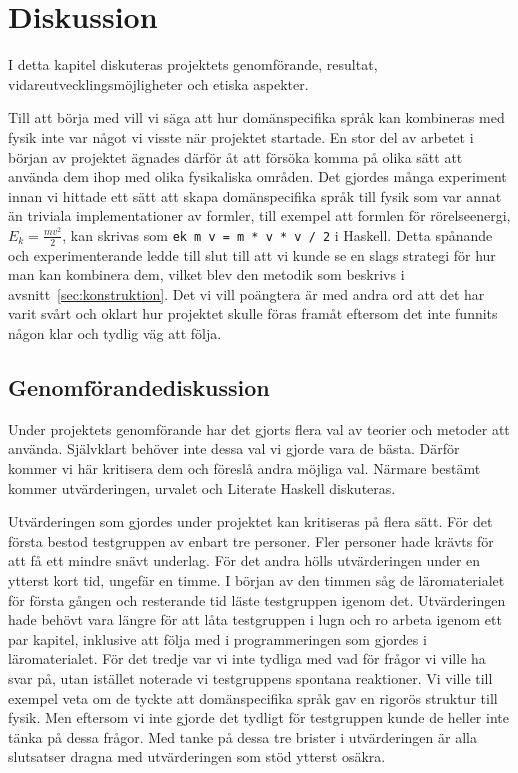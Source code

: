 
\chapter{Diskussion}

I detta kapitel diskuteras projektets genomförande, resultat,
vidareutvecklingsmöjligheter och etiska aspekter.

Till att börja med vill vi säga att hur domänspecifika språk kan kombineras med
fysik inte var något vi visste när projektet startade. En stor del av arbetet i
början av projektet ägnades därför åt att försöka komma på olika sätt att
använda dem ihop med olika fysikaliska områden. Det gjordes många experiment
innan vi hittade ett sätt att skapa domänspecifika språk till fysik som var annat än
triviala implementationer av formler, till exempel att formlen för
rörelseenergi, $E_k = \frac{mv^2}{2}$, kan skrivas som \texttt{ek m v = m * v *
v / 2} i Haskell. Detta spånande och experimenterande ledde till slut till att
vi kunde se en slags strategi för hur man kan kombinera dem, vilket blev den
metodik som beskrivs i avsnitt~\ref{sec:konstruktion}. Det vi vill poängtera är
med andra ord att det har varit svårt och oklart hur projektet skulle föras
framåt eftersom det inte funnits någon klar och tydlig väg att följa.

\section{Genomförandediskussion}

Under projektets genomförande har det gjorts flera val av teorier och metoder
att använda. Självklart behöver inte dessa val vi gjorde vara de bästa.
Därför kommer vi här kritisera dem och föreslå andra möjliga val. Närmare
bestämt kommer utvärderingen, urvalet och Literate Haskell diskuteras.

Utvärderingen som gjordes under projektet kan kritiseras på flera sätt. För det
första bestod testgruppen av enbart tre personer. Fler
personer hade krävts för att få ett mindre snävt underlag. För det andra hölls
utvärderingen under en ytterst kort tid, ungefär en timme. I början av den
timmen såg de läromaterialet för första gången och resterande tid läste
testgruppen igenom det. Utvärderingen hade behövt vara längre för att låta testgruppen
i lugn och ro arbeta igenom ett par kapitel, inklusive att följa med i
programmeringen som gjordes i läromaterialet. För det tredje var vi inte tydliga
med vad för frågor vi ville ha svar på, utan istället noterade vi testgruppens
spontana reaktioner. Vi ville till exempel veta om de tyckte att domänspecifika
språk gav en rigorös struktur till fysik. Men eftersom vi inte gjorde det
tydligt för testgruppen kunde de heller inte tänka på dessa frågor. Med tanke på
dessa tre brister i utvärderingen är alla slutsatser dragna med utvärderingen
som stöd ytterst osäkra.

